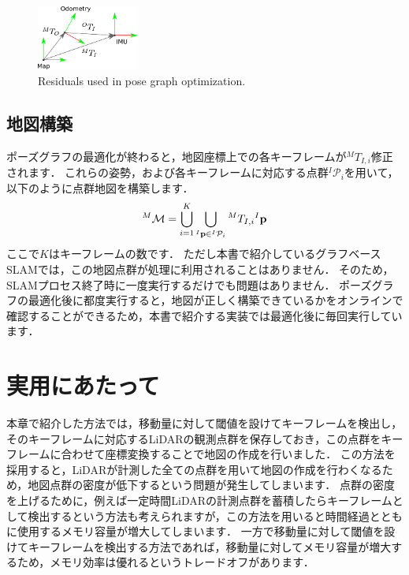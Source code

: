 \begin{figure}[!t]
  \centering
  \includegraphics[width=0.3\textwidth]{../figs/map_odom_transformation.pdf}
  \caption{Residuals used in pose graph optimization.}
  \label{fig:map_odom_transformation}
\end{figure}



\subsection{地図構築}

ポーズグラフの最適化が終わると，地図座標上での各キーフレームが${}^{M}T_{I, i}$修正されます．
これらの姿勢，および各キーフレームに対応する点群${}^{I}\mathcal{P}_{i}$を用いて，以下のように点群地図を構築します．
%
\begin{align}
  {}^{M}\mathcal{M} = \bigcup_{i=1}^{K} \bigcup_{{}^{I}{\bf p} \in {}^{I}\mathcal{P}_{i}} {}^{M}T_{I, i} {}^{I}{\bf p}
\end{align}
%
ここで$K$はキーフレームの数です．
ただし本書で紹介しているグラフベースSLAMでは，この地図点群が処理に利用されることはありません．
そのため，SLAMプロセス終了時に一度実行するだけでも問題はありません．
ポーズグラフの最適化後に都度実行すると，地図が正しく構築できているかをオンラインで確認することができるため，本書で紹介する実装では最適化後に毎回実行しています．





\section{実用にあたって}

本章で紹介した方法では，移動量に対して閾値を設けてキーフレームを検出し，そのキーフレームに対応するLiDARの観測点群を保存しておき，この点群をキーフレームに合わせて座標変換することで地図の作成を行いました．
この方法を採用すると，LiDARが計測した全ての点群を用いて地図の作成を行わくなるため，地図点群の密度が低下するという問題が発生してしまいます．
点群の密度を上げるために，例えば一定時間LiDARの計測点群を蓄積したらキーフレームとして検出するという方法も考えられますが，この方法を用いると時間経過とともに使用するメモリ容量が増大してしまいます．
一方で移動量に対して閾値を設けてキーフレームを検出する方法であれば，移動量に対してメモリ容量が増大するため，メモリ効率は優れるというトレードオフがあります．


